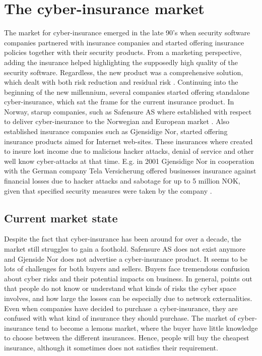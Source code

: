 \chapter{The cyber-insurance market}
\label{chp:hvahardenneaasi??} 



The market for cyber-insurance emerged in the late 90's when security software companies partnered with insurance companies and started offering insurance policies together with their security products. From a marketing perspective, adding the insurance helped highlighting the supposedly high quality of the security software. Regardless, the new product was a comprehensive solution, which dealt with both risk reduction and residual risk \cite{bolot2008new}. Continuing into the beginning of the new millennium, several companies started offering standalone cyber-insurance, which sat the frame for the current insurance product. In Norway, starup companies, such as Safensure AS where established with respect to deliver cyber-insurance to the Norwegian and European market \cite{digi}. Also established insurance companies such as Gjensidige Nor, started offering insurance products aimed for Internet web-sites. These insurances where created to insure lost income due to malicious hacker attacks, denial of service and other well know cyber-attacks at that time. E.g. in 2001 Gjensidige Nor in cooperation with the German company Tela Versicherung offered businesses insurance against financial losses due to hacker attacks and sabotage for up to 5 million NOK, given that specified security measures were taken by the company \cite{dagensithackerforsikring}. 
 
\section{Current market state}
Despite the fact that cyber-insurance has been around for over a decade, the market still struggles to gain a foothold. Safensure AS does not exist anymore and Gjenside Nor does not advertise a cyber-insurance product. It seems to be lots of challenges for both buyers and sellers. Buyers face tremendous confusion about cyber risks and their potential impacts on business. 
In general, \cite{Cyberworkshop} points out that people do not know or understand what kinds of risks the cyber space involves, 
and how large the losses can be especially due to network externalities.
Even when companies have decided to purchase a cyber-insurance, they are confused with what kind of insurance they should purchase.
The market of cyber-insurance tend to become a lemons market, where the buyer have little knowledge to choose between the different insurances. 
Hence, people will buy the cheapest insurance, although it sometimes does not satisfies their requirement. 

